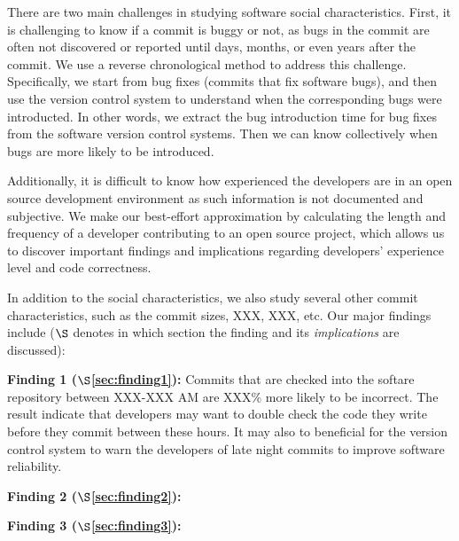 There are two main challenges in studying software social characteristics.
First, it is challenging to know if a commit is buggy or not,
as bugs in the commit are often not 
discovered or reported until days, months, or even years after the commit. 
We use a reverse chronological method to address this challenge. Specifically, we 
start from bug fixes (commits that fix software bugs), and then use the version 
control system to understand when the corresponding bugs were introducted. 
In other words, we extract the bug introduction time for bug fixes 
from the software version control systems. Then we can know 
collectively when bugs are more likely to be introduced.  

Additionally, it is difficult to know how experienced the developers are in an open source development
environment as such information is not documented and subjective. 
We make our best-effort approximation by calculating the length and frequency of a developer
contributing to an open source project, which allows us to discover important findings 
and implications regarding developers' experience level and code correctness. 

In addition to the social characteristics, we also study several other commit characteristics, such as
the commit sizes, XXX, XXX, etc. 
Our major findings 
include ($\S$ denotes in which
section the finding and its {\em implications} are discussed):

\begin{list}{}{\topsep=0pt\parsep=0pt\leftmargin=9pt\itemindent=0pt}

\vspace{0.05in}
  \item {\bf Finding 1 ($\S$\ref{sec:finding1}):} 
Commits that are checked into the softare repository between XXX-XXX AM  are  XXX\% more likely
to be incorrect. 
The result indicate that developers may want to double check the code they write  
before they commit between these hours. It may also to beneficial for the version control
system to warn the developers of late night commits to improve software reliability. 

\item {\bf Finding 2 ($\S$\ref{sec:finding2}):} 
\item {\bf Finding 3 ($\S$\ref{sec:finding3}):} 
\end{list}


